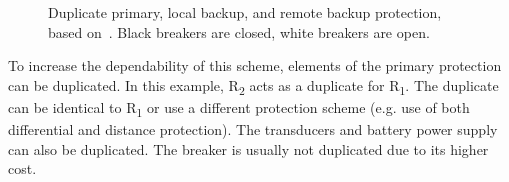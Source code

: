\begin{figure}
    \centering
     \\  \baselineskip
     \\  \baselineskip
    \caption{Duplicate primary, local backup, and remote backup protection, based on~\cite{HorowitzBook}. Black breakers are closed, white breakers are open.}
    \label{fig:fault_clearing}
\end{figure}

To increase the dependability of this scheme, elements of the primary protection can be duplicated. In this example, R\textsubscript{2} acts as a duplicate for R\textsubscript{1}. The duplicate can be identical to R\textsubscript{1} or use a different protection scheme (e.g. use of both differential and distance protection). The transducers and battery power supply can also be duplicated. The breaker is usually not duplicated due to its higher cost.

